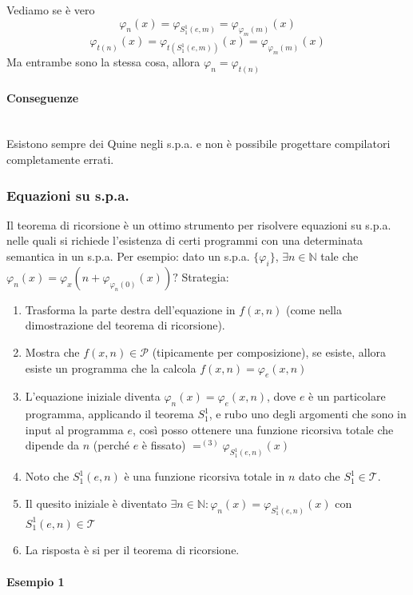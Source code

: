 \documentclass{article}
\begin{document}
Vediamo se è vero
$$\varphi_n(x)=\varphi_{S_1^1(e,m)}=\varphi_{\varphi_m(m)}(x)$$
$$\varphi_{t(n)}(x)=\varphi_{t(S_1^1(e,m))}(x)=\varphi_{\varphi_m(m)}(x)$$
Ma entrambe sono la stessa cosa, allora $\varphi_n=\varphi_{t(n)}$

\paragraph{Conseguenze}\mbox{}\\
Esistono sempre dei Quine negli s.p.a. e non è possibile progettare compilatori completamente
errati.

\subsubsection{Equazioni su s.p.a.}
Il teorema di ricorsione è un ottimo strumento per risolvere equazioni su s.p.a.
nelle quali si richiede l'esistenza di certi programmi con una determinata semantica
in un s.p.a. Per esempio: dato un s.p.a. $\{\varphi_i\}$, $\exists n\in\mathbb{N}$ tale che
$\varphi_n(x)=\varphi_x(n+\varphi_{\varphi_n(0)}(x))?$
Strategia:
\begin{enumerate}
    \item Trasforma la parte destra dell'equazione in $f(x,n)$ (come nella dimostrazione del teorema di ricorsione).
    \item Mostra che $f(x,n)\in\mathcal{P}$ (tipicamente per composizione), se esiste, allora esiste un programma che la calcola
          $f(x,n)=\varphi_e(x,n)$
    \item L'equazione iniziale diventa $\varphi_n(x)=\varphi_e(x,n)$, dove $e$ è un particolare programma,
          applicando il teorema $S_1^1$, e rubo uno degli argomenti che sono in input al programma $e$,
          così posso ottenere una funzione ricorsiva totale che dipende da $n$ (perché $e$ è fissato) $=^{(3)}\varphi_{S_1^1(e,n)}(x)$
    \item Noto che $S_1^1(e,n)$ è una funzione ricorsiva totale in $n$ dato che $S_1^1\in\mathcal{T}$.
    \item Il quesito iniziale è diventato $\exists n\in\mathbb{N}:\varphi_n(x)=\varphi_{S_1^1 (e,n)}(x)$
          con $S_1^1(e,n)\in\mathcal{T}$
    \item La risposta è si per il teorema di ricorsione.
\end{enumerate}

\paragraph{Esempio 1}\mbox{}\\
\end{document}
